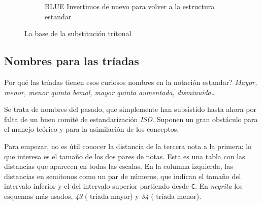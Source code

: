 \documentclass[]{report}
\begin{document}
\begin{figure}[H]
\begin{subfigure}{0.30\textwidth}
	  \end{subfigure}
	  \hfill	
	  \begin{subfigure}{0.30\textwidth}
		\centering
		\caption{\textsf{BLUE} Invertimos de nuevo para volver a la estructura estandar}
		
	  \end{subfigure}
	  \hfill	
    \caption{La base de la substitución tritonal}\label{fig:tritonal-substitution}
	\end{figure}

  

  \subsection{Nombres para las tríadas}

  Por qué las tríadas tienen esos curiosos nombres en la notación estandar? \emph{Mayor, menor, menor quinta bemol, mayor quinta   aumentada, disminuida\ldots{}}
  
  Se trata de nombres del pasado, que simplemente han subsistido hasta ahora por falta de un buen comité de estandarización \emph{ISO}. Suponen un gran obstáculo para el manejo teórico y para la asimilación de los conceptos.
  
  Para empezar, no es útil conocer la distancia de la tercera nota a la primera: lo que interesa es el tamaño de los dos pares de notas. Esta es una tabla con las distancias que aparecen en todas las escalas. En la columna izquierda, las distancias en semitonos como un par de números, que indican el tamaño del intervalo inferior y el del intervalo superior partiendo desde \texttt{C}. En \emph{negrita} los esquemas más usados, \emph{43} ( tríada mayor) y \emph{34} ( tríada menor).
  
\end{document}
